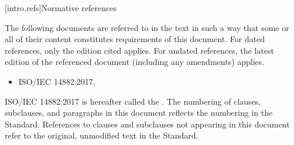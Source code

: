 
[intro.refs]{Normative references}

\pnum
The following documents are referred to in the text in such a way
that some or all of their content constitutes requirements of this 
document. For dated references, only the edition cited applies.
 For undated references, the latest edition
 of the referenced document (including any amendments) applies.

 \begin{itemize}
 \item ISO/IEC 14882:2017, 
 \end{itemize}

ISO/IEC 14882:2017 is hereafter called the .
 The numbering of clauses, subclauses, and paragraphs in this document
 reflects the numbering in the \Cpp Standard. References to clauses
 and subclauses not appearing in this document refer to
 the original, unmodified text in the \Cpp Standard.

